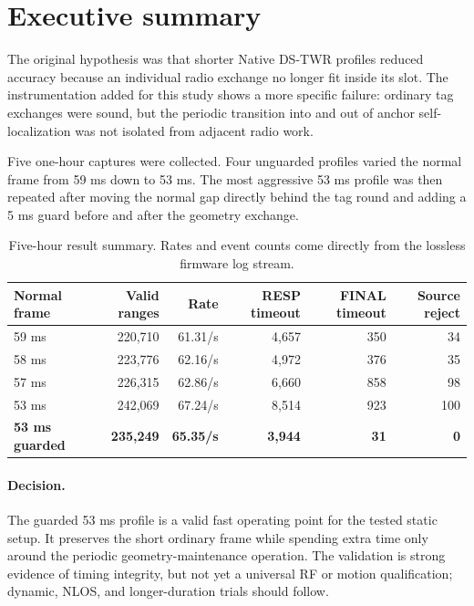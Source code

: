 \documentclass[11pt,a4paper]{article}
\newcommand{\dstwr}{DS-TWR}
\begin{document}
\tableofcontents
\clearpage
{}

\section{Executive summary}

The original hypothesis was that shorter Native \dstwr{} profiles reduced
accuracy because an individual radio exchange no longer fit inside its slot.
The instrumentation added for this study shows a more specific failure:
ordinary tag exchanges were sound, but the periodic transition into and out
of anchor self-localization was not isolated from adjacent radio work.

Five one-hour captures were collected. Four unguarded profiles varied the
normal frame from 59 ms down to 53 ms. The most aggressive 53 ms profile was
then repeated after moving the normal gap directly behind the tag round and
adding a 5 ms guard before and after the geometry exchange.

\begin{table}[H]
  \centering
  \caption{Five-hour result summary. Rates and event counts come directly
  from the lossless firmware log stream.}
  \small
  \begin{tabular}{lrrrrr}
    \toprule
    Normal frame & Valid ranges & Rate & RESP timeout & FINAL timeout & Source reject\\
    \midrule
    59 ms & 220,710 & 61.31/s & 4,657 & 350 & 34\\
    58 ms & 223,776 & 62.16/s & 4,972 & 376 & 35\\
    57 ms & 226,315 & 62.86/s & 6,660 & 858 & 98\\
    53 ms & 242,069 & 67.24/s & 8,514 & 923 & 100\\
    \textcolor{acceptedgreen}{\textbf{53 ms guarded}}
      & \textbf{235,249} & \textbf{65.35/s} & \textbf{3,944}
      & \textbf{31} & \textbf{0}\\
    \bottomrule
  \end{tabular}
\end{table}

\paragraph{Decision.}
The guarded 53 ms profile is a valid fast operating point for the tested
static setup. It preserves the short ordinary frame while spending extra time
only around the periodic geometry-maintenance operation. The validation is
strong evidence of timing integrity, but not yet a universal RF or motion
qualification; dynamic, NLOS, and longer-duration trials should follow.
\end{document}
